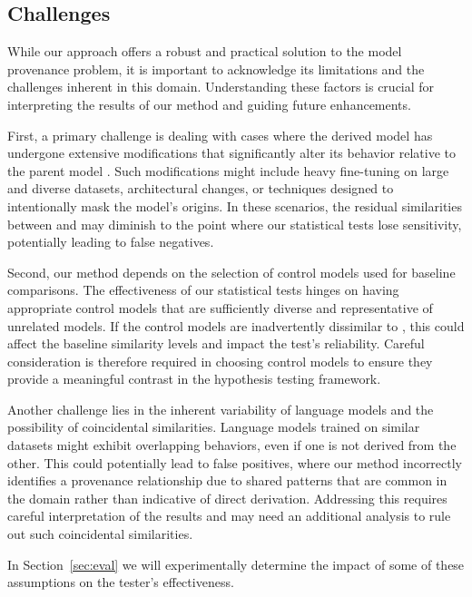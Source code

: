 \subsection{Challenges}
\label{sec:limitations}

While our approach offers a robust and practical solution to the model provenance problem, it is important to acknowledge its limitations and the challenges inherent in this domain. Understanding these factors is crucial for interpreting the results of our method and guiding future enhancements.

First, a primary challenge is dealing with cases where the derived model \llmf has undergone extensive modifications that significantly alter its behavior relative to the parent model \llmp. Such modifications might include heavy fine-tuning on large and diverse datasets, architectural changes, or techniques designed to intentionally mask the model's origins. In these scenarios, the residual similarities between \llmf and \llmp may diminish to the point where our statistical tests lose sensitivity, potentially leading to false negatives.

Second, our method depends on the selection of control models used for baseline comparisons. The effectiveness of our statistical tests hinges on having appropriate control models that are sufficiently diverse and representative of unrelated models. If the control models are inadvertently dissimilar to \llmp, this could affect the baseline similarity levels and impact the test's reliability. Careful consideration is therefore required in choosing control models to ensure they provide a meaningful contrast in the hypothesis testing framework.

Another challenge lies in the inherent variability of language models and the possibility of coincidental similarities. Language models trained on similar datasets might exhibit overlapping behaviors, even if one is not derived from the other. This could potentially lead to false positives, where our method incorrectly identifies a provenance relationship due to shared patterns that are common in the domain rather than indicative of direct derivation. Addressing this requires careful interpretation of the results and may need an additional analysis to rule out such coincidental similarities.

In Section~\ref{sec:eval} we will experimentally determine the impact of some of these assumptions on the tester's effectiveness.




